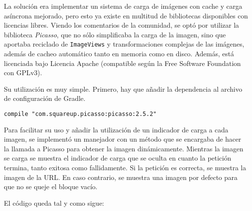 La solución era implementar un sistema de carga de imágenes con cache y carga
asíncrona mejorado, pero esto ya existe en multitud de bibliotecas disponibles
con licencias libres. Viendo los comentarios de la comunidad, se optó por
utilizar la biblioteca \textit{Picasso},\cite{picasso}\cite{picasso-book} que no
sólo simplificaba la carga de la imagen, sino que aportaba reciclado de
\texttt{ImageViews} y transformaciones complejas de las imágenes, además de
cacheo automático tanto en memoria como en disco. Además, está licenciada bajo
Licencia Apache (compatible según la Free Software Foundation con GPLv3).

Su utilización es muy simple. Primero, hay que añadir la dependencia al archivo
de configuración de Gradle.

\begin{verbatim}
compile "com.squareup.picasso:picasso:2.5.2"
\end{verbatim}

Para facilitar su uso y añadir la utilización de un indicador de carga a cada
imagen, se implementó un manejador con un método que se encargaba de hacer
la llamada a Picasso para obtener la imagen dinámicamente. Mientras la imagen
se carga se muestra el indicador de carga que se oculta en cuanto la petición
termina, tanto exitosa como fallidamente. Si la petición es correcta, se muestra
la imagen de la URL. En caso contrario, se muestra una imagen por defecto para
que no se queje el bloque vacío.

El código queda tal y como sigue:

